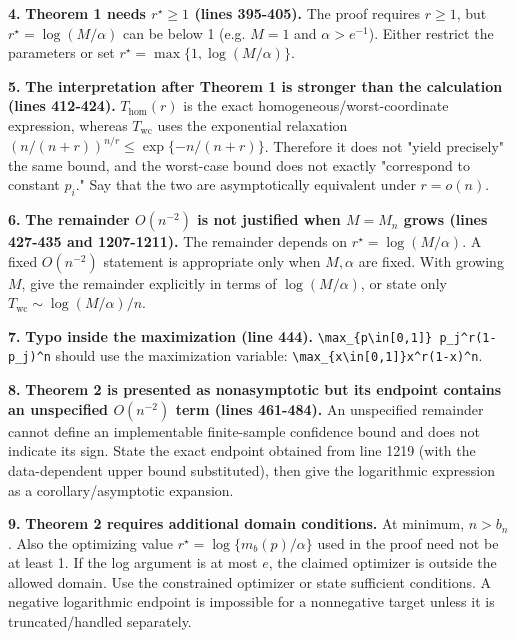 \documentclass[10pt,a4paper]{article}
\begin{document}
\par\medskip\noindent\textbf{4.} \textbf{Theorem 1 needs \(r^\star\ge1\) (lines 395-405).} The proof requires \(r\ge1\), but \(r^\star=\log(M/\alpha)\) can be below 1 (e.g. \(M=1\) and \(\alpha>e^{-1}\)). Either restrict the parameters or set \(r^\star=\max\{1,\log(M/\alpha)\}\).

\par\medskip\noindent\textbf{5.} \textbf{The interpretation after Theorem 1 is stronger than the calculation (lines 412-424).} \(T_{\mathrm{hom}}(r)\) is the exact homogeneous/worst-coordinate expression, whereas \(T_{\mathrm{wc}}\) uses the exponential relaxation
\((n/(n+r))^{n/r}\le \exp\{-n/(n+r)\}\). Therefore it does not "yield precisely" the same bound, and the worst-case bound does not exactly "correspond to constant \(p_i\)." Say that the two are asymptotically equivalent under \(r=o(n)\).

\par\medskip\noindent\textbf{6.} \textbf{The remainder \(O(n^{-2})\) is not justified when \(M=M_n\) grows (lines 427-435 and 1207-1211).} The remainder depends on \(r^\star=\log(M/\alpha)\). A fixed \(O(n^{-2})\) statement is appropriate only when \(M,\alpha\) are fixed. With growing \(M\), give the remainder explicitly in terms of \(\log(M/\alpha)\), or state only \(T_{\mathrm{wc}}\sim\log(M/\alpha)/n\).

\par\medskip\noindent\textbf{7.} \textbf{Typo inside the maximization (line 444).} \texttt{\textbackslash{}\allowbreak{}max\_\allowbreak{}\{\allowbreak{}p\textbackslash{}\allowbreak{}in[0,1]\}\allowbreak{} p\_\allowbreak{}j\textasciicircum{}\allowbreak{}r(1-p\_\allowbreak{}j)\textasciicircum{}\allowbreak{}n} should use the maximization variable: \texttt{\textbackslash{}\allowbreak{}max\_\allowbreak{}\{\allowbreak{}x\textbackslash{}\allowbreak{}in[0,1]\}\allowbreak{}x\textasciicircum{}\allowbreak{}r(1-x)\textasciicircum{}\allowbreak{}n}.

\par\medskip\noindent\textbf{8.} \textbf{Theorem 2 is presented as nonasymptotic but its endpoint contains an unspecified \(O(n^{-2})\) term (lines 461-484).} An unspecified remainder cannot define an implementable finite-sample confidence bound and does not indicate its sign. State the exact endpoint obtained from line 1219 (with the data-dependent upper bound substituted), then give the logarithmic expression as a corollary/asymptotic expansion.

\par\medskip\noindent\textbf{9.} \textbf{Theorem 2 requires additional domain conditions.} At minimum, \(n>b_n\). Also the optimizing value \(r^\star=\log\{m_b(p)/\alpha\}\) used in the proof need not be at least 1. If the log argument is at most \(e\), the claimed optimizer is outside the allowed domain. Use the constrained optimizer or state sufficient conditions. A negative logarithmic endpoint is impossible for a nonnegative target unless it is truncated/handled separately.
\end{document}
